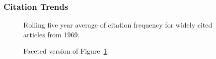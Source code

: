 \documentclass[
  10pt,
  letterpaper,
  DIV=11,
  numbers=noendperiod,
  twoside]{scrartcl}
\begin{document}
\subsubsection*{Citation Trends}\label{sec-trends-1969}

\begin{figure}


\caption{\label{fig-citation-spaghetti-1969}Rolling five year average of
citation frequency for widely cited articles from 1969.}

\end{figure}%

\begin{figure}


\caption{\label{fig-citation-facet-1969}Faceted version of
Figure~\ref{fig-citation-spaghetti-1969}.}

\end{figure}%
\end{document}
